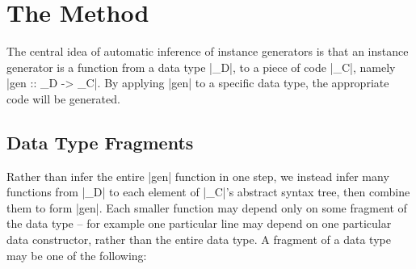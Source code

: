 \documentclass{llncs}
\begin{document}
\begin{comment}
Writing an instance generator requires knowledge of the representation of both the data type, and the Haskell syntax tree. Unfortunately, the Haskell syntax tree is represented by a large data type, which takes time to learn. After writing an instance generator, the user must check that the generator matches their intention, by testing on a suitable range of data types. Both of these factors increase the time required to write an instance generator.

We have integrated automatic derivation of an instance generator, following the scheme in this paper, into the Derive tool. In order to specify a new instance generator, the user can \textit{either} specify a derivation function, \textit{or} have one automatically generated from an example.
\end{comment}

\section{The Method}
\label{sec:automatic_instances}

The central idea of automatic inference of instance generators is that an instance generator is a function from a data type |_D|, to a piece of code |_C|, namely |gen :: _D -> _C|. By applying |gen| to a specific data type, the appropriate code will be generated.

\subsection{Data Type Fragments}

Rather than infer the entire |gen| function in one step, we instead infer many functions from |_D| to each element of |_C|'s abstract syntax tree, then combine them to form |gen|. Each smaller function may depend only on some fragment of the data type -- for example one particular line may depend on one particular data constructor, rather than the entire data type. A fragment of a data type may be one of the following:
\end{document}

